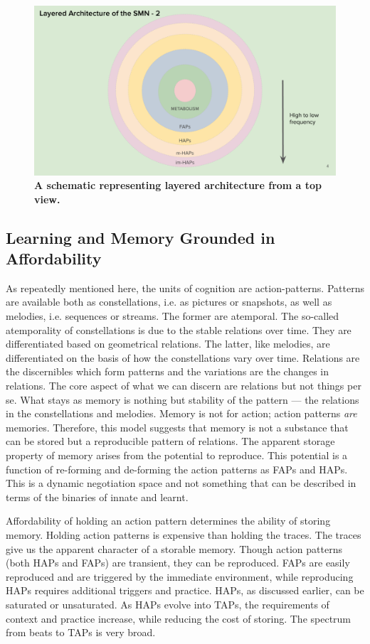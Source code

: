 \begin{figure}[ht] 
\includegraphics[width=\textwidth]{graphics/TopviewLayers.pdf}
\caption{\textbf{A schematic representing layered architecture from a top view.}}
\label{top_view_lSMN}
\end{figure}

\subsection{Learning and Memory Grounded in Affordability}
As repeatedly mentioned here, the units of cognition are action-patterns. Patterns are available both as constellations, i.e. as pictures or snapshots, as well as melodies, i.e. sequences or streams. The former are atemporal. The so-called atemporality of constellations is due to the stable relations over time. They are differentiated based on geometrical relations. The latter, like melodies, are differentiated on the basis of how the constellations vary over time. Relations are the discernibles which form patterns and the variations are the changes in relations. The core aspect of what we can discern are relations but not things per se. What stays as memory is nothing but stability of the pattern --- the relations in the constellations and melodies. Memory is not for action; action patterns \textit{are} memories. Therefore, this model suggests that memory is not a substance that can be stored but a reproducible pattern of relations. The apparent storage property of memory arises from the potential to reproduce.
This potential is a function of re-forming and de-forming the action patterns as FAPs and HAPs. This is a dynamic negotiation space and not something that can be described in terms of the binaries of innate and learnt. 

Affordability of holding an action pattern determines the ability of storing memory. Holding action patterns is expensive than holding the traces. The traces give us the apparent character of a storable memory. Though action patterns (both HAPs and FAPs) are transient, they can be reproduced. FAPs are easily reproduced and are triggered by the immediate environment, while reproducing HAPs requires additional triggers and practice. HAPs, as discussed earlier, can be saturated or unsaturated. As HAPs evolve into TAPs, the requirements of context and practice increase, while reducing the cost of storing. The spectrum from beats to TAPs is very broad. 

